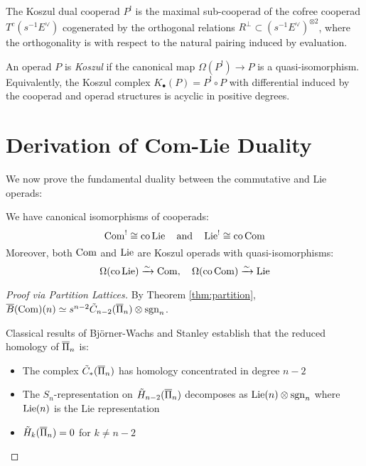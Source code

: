 \begin{example}
\begin{definition}
The Koszul dual cooperad $P^!$ is the maximal sub-cooperad of the cofree cooperad $T^c(s^{-1}E^\vee)$ cogenerated by the orthogonal relations $R^\perp \subset (s^{-1}E^\vee)^{\otimes 2}$, where the orthogonality is with respect to the natural pairing induced by evaluation.
\end{definition}
 
\begin{definition}
An operad $P$ is \emph{Koszul} if the canonical map $\Omega(P^!) \to P$ is a quasi-isomorphism. Equivalently, the Koszul complex $K_\bullet(P) = P^! \circ P$ with differential induced by the cooperad and operad structures is acyclic in positive degrees.
\end{definition}
 
\section{Derivation of Com-Lie Duality}
 
We now prove the fundamental duality between the commutative and Lie operads:
 
\begin{theorem}\label{thm:com-lie}
We have canonical isomorphisms of cooperads:
\[
\operatorname{Com}^! \cong \text{co}\operatorname{Lie} \quad \text{and} \quad \operatorname{Lie}^! \cong \text{co}\operatorname{Com}
\]
Moreover, both $\operatorname{Com}$ and $\operatorname{Lie}$ are Koszul operads with quasi-isomorphisms:
\[
\Omega(\text{co}\operatorname{Lie}) \xrightarrow{\sim} \operatorname{Com}, \quad \Omega(\text{co}\operatorname{Com}) \xrightarrow{\sim} \operatorname{Lie}
\]
\end{theorem}
 
\begin{proof}[Proof via Partition Lattices]
By Theorem \ref{thm:partition}, $\overline{B}(\operatorname{Com})(n) \simeq s^{n-2}\tilde{C}_{n-2}(\overline{\Pi}_n) \otimes \operatorname{sgn}_n$.
 
Classical results of Björner-Wachs \cite{BW93} and Stanley \cite{Sta97} establish that the reduced homology of $\overline{\Pi}_n$ is:
\begin{itemize}
\item The complex $\tilde{C}_*(\overline{\Pi}_n)$ has homology concentrated in degree $n-2$
\item The $S_n$-representation on $\tilde{H}_{n-2}(\overline{\Pi}_n)$ decomposes as $\operatorname{Lie}(n) \otimes \operatorname{sgn}_n$ where $\operatorname{Lie}(n)$ is the Lie representation
\item $\tilde{H}_k(\overline{\Pi}_n) = 0$ for $k \neq n-2$
\end{itemize}
 

\end{proof}
\end{example}

